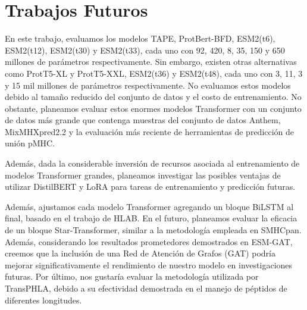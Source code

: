 \section{Trabajos Futuros}
En este trabajo, evaluamos los modelos TAPE, ProtBert-BFD, ESM2(t6), ESM2(t12), ESM2(t30) y ESM2(t33), cada uno con 92, 420, 8, 35, 150 y 650 millones de parámetros respectivamente. Sin embargo, existen otras alternativas como ProtT5-XL y ProtT5-XXL, ESM2(t36) y ESM2(t48), cada uno con 3, 11, 3 y 15 mil millones de parámetros respectivamente. No evaluamos estos modelos debido al tamaño reducido del conjunto de datos y el costo de entrenamiento. No obstante, planeamos evaluar estos enormes modelos Transformer con un conjunto de datos más grande que contenga muestras del conjunto de datos Anthem, MixMHXpred2.2 y la evaluación más reciente de herramientas de predicción de unión pMHC.

Además, dada la considerable inversión de recursos asociada al entrenamiento de modelos Transformer grandes, planeamos investigar las posibles ventajas de utilizar DistilBERT y LoRA para tareas de entrenamiento y predicción futuras.

Además, ajustamos cada modelo Transformer agregando un bloque BiLSTM al final, basado en el trabajo de HLAB. En el futuro, planeamos evaluar la eficacia de un bloque Star-Transformer, similar a la metodología empleada en SMHCpan. Además, considerando los resultados prometedores demostrados en ESM-GAT, creemos que la inclusión de una Red de Atención de Grafos (GAT) podría mejorar significativamente el rendimiento de nuestro modelo en investigaciones futuras. Por último, nos gustaría evaluar la metodología utilizada por TransPHLA, debido a su efectividad demostrada en el manejo de péptidos de diferentes longitudes.